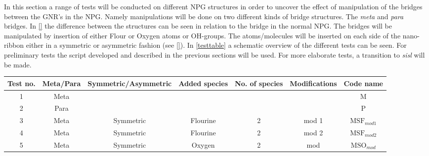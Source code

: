 In this section a range of tests will be conducted on different NPG structures in order to uncover the effect of manipulation of the bridges between the GNR's in the NPG. Namely manipulations will be done on two different kinds of bridge structures. The \textit{meta} and \textit{para} bridges. In \cref{} the difference between the structures can be seen in relation to the bridge in the normal NPG. The bridges will be manipulated by insertion of either Flour or Oxygen atoms or OH-groups. The atoms/molecules will be inserted on each side of the nano-ribbon either in a symmetric or asymmetric fashion (see \cref{}). In \cref{testtable} a schematic overview of the different tests can be seen. For preliminary tests the script developed and described in the previous sections will be used. For more elaborate tests, a transition to \textit{sisl} will be made.
\begin{table}[ht]
\begin{tabular}{|c|c|c|c|c|c|c|}
\hline
\multicolumn{1}{|l|}{Test no.} & \multicolumn{1}{l|}{Meta/Para} & \multicolumn{1}{l|}{Symmetric/Asymmetric} & \multicolumn{1}{l|}{Added species} & No. of species & \multicolumn{1}{l|}{Modifications} & \multicolumn{1}{l|}{Code name}      \\ \hline
1                              & Meta                           &                                           &                              &                &                                    & M                                   \\ \hline
2                              & Para                           &                                           &                              &                &                                    & P                                   \\ \hline
3                              & Meta                           & Symmetric                                 & Flourine                     & 2              & mod 1                              & \(\text{MSF}_{mod1}\)                       \\ \hline
4                              & Meta                           & Symmetric                                 & Flourine                     & 2              & mod 2                              & \(\text{MSF}_{mod2}\)                       \\ \hline
5                              & Meta                           & Symmetric                                 & Oxygen                       & 2              & mod                                & \(\text{MSO}_{mod}\)                        \\ \hline

\end{tabular}
\end{table}
